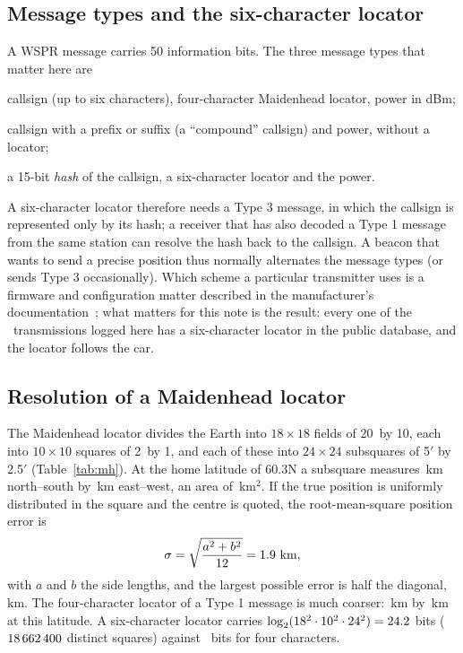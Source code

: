 \documentclass[10pt,a4paper]{article}
\begin{document}
\subsection{Message types and the six-character locator}
A WSPR message carries 50 information bits. The three message types that matter here are
\begin{description}[leftmargin=1.2em,style=nextline]
\item[Type 1] callsign (up to six characters), four-character Maidenhead locator, power in dBm;
\item[Type 2] callsign with a prefix or suffix (a ``compound'' callsign) and power, without a locator;
\item[Type 3] a 15-bit \emph{hash} of the callsign, a six-character locator and the power.
\end{description}
A six-character locator therefore needs a Type 3 message, in which the callsign is represented only by its hash; a receiver that has also decoded a Type 1 message from the same station can resolve the hash back to the callsign. A beacon that wants to send a precise position thus normally alternates the message types (or sends Type 3 occasionally). Which scheme a particular transmitter uses is a firmware and configuration matter described in the manufacturer's documentation~\cite{zachtek}; what matters for this note is the result: every one of the \wFixes\ transmissions logged here has a six-character locator in the public database, and the locator follows the car.

\subsection{Resolution of a Maidenhead locator}
The Maidenhead locator divides the Earth into $18\times18$ fields of 20\textdegree\ by 10\textdegree, each into $10\times10$ squares of 2\textdegree\ by 1\textdegree, and each of these into $24\times24$ subsquares of 5$'$ by 2.5$'$ (Table~\ref{tab:mh}). At the home latitude of 60.3\textdegree N a subsquare measures \wSqNS\,km north--south by \wSqEW\,km east--west, an area of \wSqArea\,km$^2$. If the true position is uniformly distributed in the square and the centre is quoted, the root-mean-square position error is
\begin{equation}
\sigma = \sqrt{\frac{a^2+b^2}{12}} = \wRMS\ \text{km},
\end{equation}
with $a$ and $b$ the side lengths, and the largest possible error is half the diagonal, \wHalfDiag\,km. The four-character locator of a Type 1 message is much coarser: \wSqFourNS\,km by \wSqFourEW\,km at this latitude. A six-character locator carries $\log_2(18^2\cdot10^2\cdot24^2)=24.2$ bits ($18\,662\,400$ distinct squares) against \wBitsFour\ bits for four characters.
\end{document}
